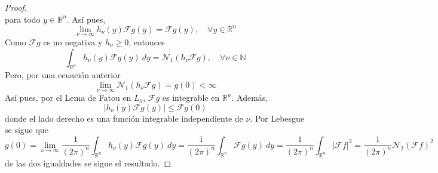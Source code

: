 \documentclass[12pt]{report}
\theoremstyle{largebreak}
\renewcommand{\leq}{\ensuremath{\leqslant}}
\renewcommand{\geq}{\ensuremath{\geqslant}}
\newcommand\abs[1]{\ensuremath{\left|#1\right|}}
\newcommand{\N}[2]{\ensuremath{\mathcal{N}_{#1}\left(#2\right)}}
\newcommand{\fou}[1]{\ensuremath{\mathcal{F}#1}}
\begin{document}
\begin{proof}
\begin{equation*}
        \end{equation*}
        para todo $y\in\mathbb{R}^n$. Así pues,
        \begin{equation*}
            \lim_{\nu\rightarrow\infty}h_\nu(y)\fou{g}(y)=\fou{g}(y),\quad\forall y\in\mathbb{R}^n
        \end{equation*}
        Como $\fou{g}$ es no negativa y $h_\nu\geq0$, entonces
        \begin{equation*}
            \int_{\mathbb{R}^n}h_\nu(y)\fou{g}(y)\:dy=\N{1}{h_\nu\fou{g}},\quad\forall \nu\in\mathbb{N}
        \end{equation*}
        Pero, por una ecuación anterior
        \begin{equation*}
            \lim_{\nu\rightarrow\infty}\N{1}{h_\nu\fou{g}}=g(0)<\infty
        \end{equation*}
        Así pues, por el Lema de Fatou en $L_1$, $\fou{g}$ es integrable en $\mathbb{R}^n$. Además,
        \begin{equation*}
            \abs{h_\nu(y)\fou{g}(y)}\leq\fou{g}(0)
        \end{equation*}
        donde el lado derecho es una función integrable independiente de $\nu$. Por Lebesgue se sigue que
        \begin{equation*}
            g(0)=\lim_{\nu\rightarrow\infty}\frac{1}{(2\pi)^n}\int_{\mathbb{R}^n}h_\nu(y)\fou{g}(y)\:dy=\frac{1}{(2\pi)^n}\int_{\mathbb{R}^n}\fou{g}(y)\:dy=\frac{1}{(2\pi)^n}\int_{\mathbb{R}^n}\abs{\fou{f}}^2=\frac{1}{(2\pi)^n}\N{2}{\fou{f}}^2
        \end{equation*}
        de las dos igualdades se sigue el resultado.
    \end{proof}
\end{document}
